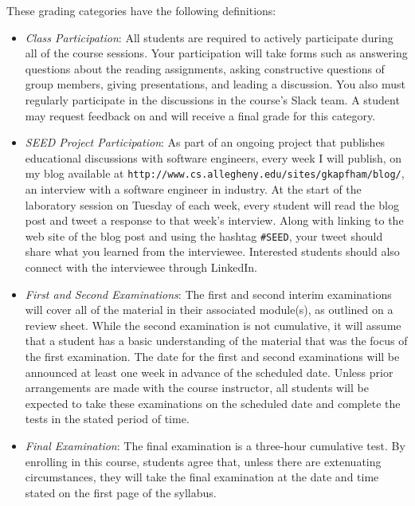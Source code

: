 \documentclass[11pt]{article}
\newcommand{\url}[1]{\lstinline{#1}}
\begin{document}
\vspace*{-.1in}
\noindent
These grading categories have the following definitions:
\vspace*{-.1in}

\begin{itemize}
  \itemsep0em

  \item {\em Class Participation\/}: All students are required to actively participate during all of the course
    sessions. Your participation will take forms such as answering questions about the reading assignments, asking
    constructive questions of group members, giving presentations, and leading a discussion. You also must regularly
    participate in the discussions in the course's Slack team. A student may request feedback on and will receive a
    final grade for this category.

  \item {\em SEED Project Participation\/}: As part of an ongoing project that publishes educational discussions with
    software engineers, every week I will publish, on my blog available at
    \url{http://www.cs.allegheny.edu/sites/gkapfham/blog/}, an interview with a software engineer in industry. At the
    start of the laboratory session on Tuesday of each week, every student will read the blog post and tweet a response
    to that week's interview. Along with linking to the web site of the blog post and using the hashtag \url{#SEED},
    your tweet should share what you learned from the interviewee. Interested students should also connect with the
    interviewee through LinkedIn.

  \item {\em First and Second Examinations\/}: The first and second interim examinations will cover all of the material
    in their associated module(s), as outlined on a review sheet. While the second examination is not cumulative, it
    will assume that a student has a basic understanding of the material that was the focus of the first examination.
    The date for the first and second examinations will be announced at least one week in advance of the scheduled date.
    Unless prior arrangements are made with the course instructor, all students will be expected to take these
    examinations on the scheduled date and complete the tests in the stated period of time.

  \item {\em Final Examination\/}: The final examination is a three-hour cumulative test. By enrolling in this course,
    students agree that, unless there are extenuating circumstances, they will take the final examination at the date
    and time stated on the first page of the syllabus.


\end{itemize}
\end{document}
